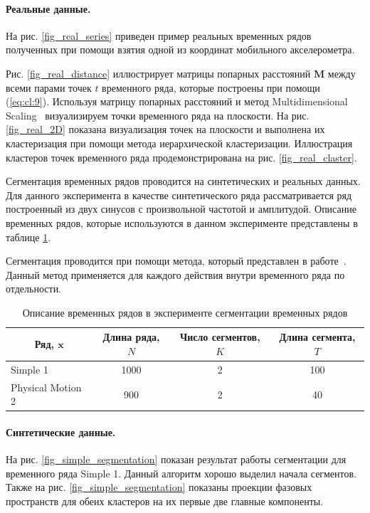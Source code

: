 \paragraph{Реальные данные.}

На рис. \ref{fig_real_series} приведен пример реальных временных рядов полученных при помощи взятия одной из координат мобильного акселерометра. 

Рис. \ref{fig_real_distance} иллюстрирует матрицы попарных расстояний $\textbf{M}$ между всеми парами точек $t$ временного ряда, которые построены при помощи (\ref{eq:cl:9}). 
Используя матрицу попарных расстояний и метод Multidimensional Scaling~\cite{Borg2005} визуализируем точки временного ряда на плоскости. 
На рис. \ref{fig_real_2D} показана визуализация точек на плоскости и выполнена их кластеризация при помощи метода иерархической кластеризации. 
Иллюстрация кластеров точек временного ряда продемонстрирована на рис. \ref{fig_real_claster}.

Сегментация временных рядов проводится на синтетических и реальных данных. Для данного эксперимента в качестве синтетического ряда рассматривается ряд построенный из двух синусов с произвольной частотой и амплитудой. Описание временных рядов, которые используются в данном эксперименте представлены в таблице \ref{table:3}.

Сегментация проводится при помощи метода, который представлен в работе~\cite{motrenko2015}. Данный метод применяется для каждого действия внутри временного ряда по отдельности.


\begin{table}[h!t]
\begin{center}
\caption{Описание временных рядов в эксперименте сегментации временных рядов}
\label{table:3}
\begin{tabular}{|c|c|c|c|}
\hline
	Ряд, $\textbf{x}$ &Длина ряда, $N$& Число сегментов, $K$&Длина сегмента, $T$\\
	\hline
	\multicolumn{1}{|l|}{Simple 1}
	& 1000& 2& 100\\
	\hline
	\multicolumn{1}{|l|}{Physical Motion 2}
	& 900& 2& 40\\
\hline

\end{tabular}
\end{center}
\end{table}

\paragraph{Синтетические данные.} На рис. \ref{fig_simple_segmentation} показан результат работы сегментации для временного ряда Simple 1. 
Данный алгоритм хорошо выделил начала сегментов. 
Также на рис. \ref{fig_simple_segmentation} показаны проекции фазовых пространств для обеих кластеров на их первые две главные компоненты.

